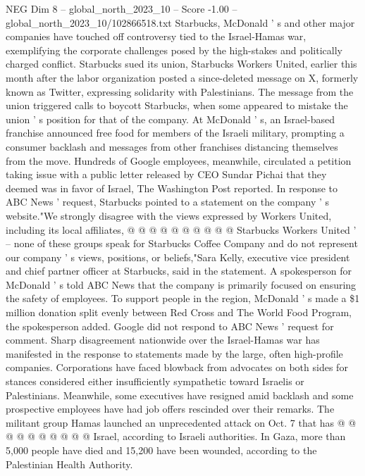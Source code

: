 \begin{textsample}{NEG Dim 8 – global\_north\_2023\_10 – Score -1.00 – global\_north\_2023\_10/102866518.txt}  \label{ex:f8_neg_245}
Starbucks, McDonald ' s and other major companies have touched off controversy tied to the Israel-Hamas war, exemplifying the corporate challenges posed by the high-stakes and politically charged conflict.
Starbucks sued its union, Starbucks Workers United, earlier this month after the labor organization posted a since-deleted message on X, formerly known as Twitter, expressing solidarity with Palestinians.
The message from the union triggered calls to boycott Starbucks, when some appeared to mistake the union ' s position for that of the company.
At McDonald ' s, an Israel-based franchise announced free food for members of the Israeli military, prompting a consumer backlash and messages from other franchises distancing themselves from the move.
Hundreds of Google employees, meanwhile, circulated a petition taking issue with a public letter released by CEO Sundar Pichai that they deemed was in favor of Israel, The Washington Post reported.
In response to ABC News ' request, Starbucks pointed to a statement on the company ' s website."We strongly disagree with the views expressed by Workers United, including its local affiliates, @ @ @ @ @ @ @ @ @ @ Starbucks Workers United ' -- none of these groups speak for Starbucks Coffee Company and do not represent our company ' s views, positions, or beliefs,"Sara Kelly, executive vice president and chief partner officer at Starbucks, said in the statement.
A spokesperson for McDonald ' s told ABC News that the company is primarily focused on ensuring the safety of employees.
To support people in the region, McDonald ' s made a \$1 million donation split evenly between Red Cross and The World Food Program, the spokesperson added.
Google did not respond to ABC News ' request for comment.
Sharp disagreement nationwide over the Israel-Hamas war has manifested in the response to statements made by the large, often high-profile companies.
Corporations have faced blowback from advocates on both sides for stances considered either insufficiently sympathetic toward Israelis or Palestinians.
Meanwhile, some executives have resigned amid backlash and some prospective employees have had job offers rescinded over their remarks.
The militant group Hamas launched an unprecedented attack on Oct. 7 that has @ @ @ @ @ @ @ @ @ @ Israel, according to Israeli authorities.
In Gaza, more than 5,000 people have died and 15,200 have been wounded, according to the Palestinian Health Authority.

\end{textsample}
